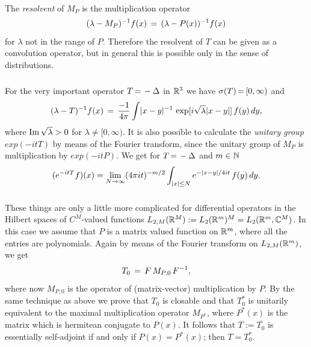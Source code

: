\documentclass[11pt,twoside]{article}
\begin{document}
\paragraph*{}
The \textit{resolvent} of $M_P$ is the multiplication operator
\[
(\lambda - M_P)^{-1} f(x) \= (\lambda - P(x))^{-1} f(x)
\]
for $\lambda$ not in the range of $P$.
Therefore the resolvent of $T$ can be given as a convolution operator,
but in general this is possible only in the sense of distributions.

\subparagraph*{}
For the very important operator $T \eq -\Delta$ in $\R^3$
we have $\sigma(T) \eq [0,\infty)$ and 
\[
(\lambda - T)^{-1} f(x) \= \frac{-1}{4\pi}
\int \abs{x-y} ^{-1} \, \exp [i \sqrt{\lambda} \abs{x-y} ] \, f(y) \, dy,
\]
where $\im \sqrt{\lambda} > 0$ for $\lambda \neq [0,\infty)$.
It is also possible to calculate the \textit{unitary group} $exp(-itT)$
by means of the Fourier transform,
since the unitary group of $M_P$ is multiplication by $exp(-itP)$.
We get for $T \eq -\Delta$ and $m \in \N$
\[
(e^{-itT}f)(x) = \lim_{N \to \infty} (4\pi it)^{-m/2}
\int_{\abs{x} \leq N} e^{-\abs{x-y} /4it} \, f(y)\,dy.
\]

\subparagraph*{}
These things are only a little more complicated for differential operators
in the Hilbert spaces of $C^M$-valued functions
$L_{2,M}(\R^M) := L_2(\R^m)^M = L_2(\R^m,\C^M)$.
In this case we assume that $P$ is a matrix valued function on $\R^m$,
where all the entries are polynomials.
Again by means of the Fourier transform on $L_{2,M}(\R^m)$,
we get
\[
T_0 \= F \, M_{P,0} \, F^{-1},
\]
where now $M_{P,0}$ is the operator of (matrix-vector) multiplication by $P$.
By the same technique as above we prove that $T_0$ is closable and
that $T_0^*$ is unitarily equivalent to the maximal multiplication operator
$M_{P^*}$,
where $P^*(x)$ is the matrix which is hermitean conjugate to $P(x)$.
It follows that $T := \overline{T_0}$ is essentially self-adjoint
if and only if $P(x) = P^*(x)$; then $T = T_0^*$.
\end{document}
